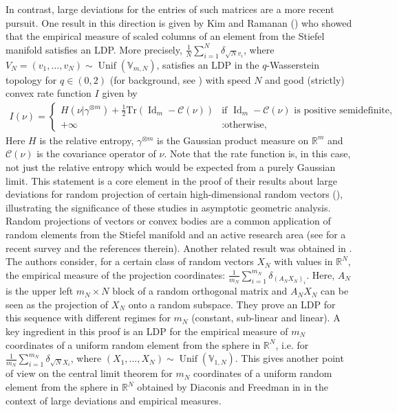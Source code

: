 \documentclass[11pt,a4paper,twoside]{article}
\newcommand{\V}{\mathbb V}
\newcommand{\R}{\mathbb R}
\DeclareMathOperator{\Unif}{Unif}
\theoremstyle{definition}
\begin{document}
	In contrast, large deviations for the entries of such matrices are a more recent pursuit. One result in this direction is given by Kim and Ramanan (\cite[Theorem 2.8]{kim2021large}) who showed that the empirical measure of scaled columns of an element from the Stiefel manifold satisfies an LDP. More precisely, $\frac{1}{N} \sum_{i=1}^{N} \delta_{\sqrt{N} v_i}$, where $V_N = (v_1, \ldots, v_N) \sim \Unif(\V_{m,N})$, satisfies an LDP in the $q$-Wasserstein topology for $q\in (0,2)$ (for background, see \cite{panaretos2020invitation}) with speed $N$ and good (strictly) convex rate function $I$ given by 
	\begin{align}\label{eq:ratefunctionstiefelkim}
	I(\nu) = \begin{cases}
		H(\nu| \gamma^{\otimes m}) +\frac{1}{2}\mathrm{Tr}(\operatorname{Id}_m - \mathcal{C}(\nu)) & \text{if } \operatorname{Id}_m-\mathcal{C}(\nu) \text{ is positive semidefinite}, \\
		+\infty & : \text{otherwise,}
	\end{cases}
	\end{align}
	Here $H$ is the relative entropy, $\gamma^{\otimes m}$ is the Gaussian product measure on $\R^m$ and $\mathcal{C}(\nu)$ is the covariance operator of $\nu$. Note that the rate function is, in this case, not just the relative entropy which would be expected from a purely Gaussian limit. This statement is a core element in the proof of their results about large deviations for random projection of certain high-dimensional random vectors (\cite[Theorem 2.4 and Theorem 2.6]{kim2021large}), illustrating the significance of these studies in asymptotic geometric analysis. Random projections of vectors or convex bodies are a common application of random elements from the Stiefel manifold and an active research area (see \cite{Prochno2024} for a recent survey and the references therein). Another related result was obtained in \cite{KLR2022}. The authors consider, for a certain class of random vectors $X_N$ with values in $\R^N$, the empirical measure of the projection coordinates:
	$
	\frac{1}{m_N} \sum_{i=1}^{m_N} \delta_{(A_N X_N)_i}.
	$
	Here, $A_N$ is the upper left $m_N \times N$ block of a random orthogonal matrix and $A_NX_N$ can be seen as the projection of $X_N$ onto a random subspace. They prove an LDP for this sequence with different regimes for $m_N$ (constant, sub-linear and linear). A key ingredient in this proof is an LDP for the empirical measure of $m_N$ coordinates of a uniform random element from the sphere in $\R^N$, i.e. for $\frac{1}{m_N} \sum_{i=1}^{m_N} \delta_{\sqrt{N} X_i}$, where $(X_1,\ldots, X_N)\sim \Unif(\V_{1,N})$. This gives another point of view on the central limit theorem for $m_N$ coordinates of a uniform random element from the sphere in $\R^N$ obtained by Diaconis and Freedman in \cite{diaconis1987dozen} in the context of large deviations and empirical measures. \\
\end{document}

